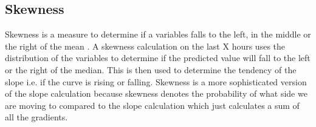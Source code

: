 \subsection{Skewness}
\label{sec:skewness}
Skewness is a measure to determine if a variables falls to the left, in the middle or the right of the mean \cite[Chapter~1.1.2]{econometrics}. A skewness calculation on the last X hours uses the distribution of the variables to determine if the predicted value will fall to the left or the right of the median. This is then used to determine the tendency of the slope i.e. if the curve is rising or falling. Skewness is a more sophisticated version of the slope calculation because skewness denotes the probability of what side we are moving to compared to the slope calculation which just calculates a sum of all the gradients.


